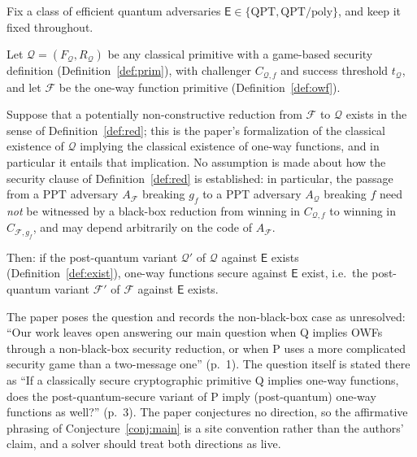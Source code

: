 \documentclass{aicr-conjecture}
\newcommand{\Qc}{\mathcal{Q}}
\newcommand{\Fc}{\mathcal{F}}
\newcommand{\Es}{\mathsf{E}}
\newcommand{\PPT}{\mathrm{PPT}}
\newcommand{\QPT}{\mathrm{QPT}}
\newcommand{\QPTpoly}{\mathrm{QPT}/\mathrm{poly}}
\begin{document}
\begin{conjecture}\label{conj:main}
Fix a class of efficient quantum adversaries
$\Es \in \{\QPT, \QPTpoly\}$, and keep it fixed throughout.

Let $\Qc = (F_{\Qc}, R_{\Qc})$ be any classical primitive with a
game-based security definition (Definition~\ref{def:prim}), with
challenger $C_{\Qc,f}$ and success threshold $t_{\Qc}$, and let $\Fc$ be
the one-way function primitive (Definition~\ref{def:owf}).

Suppose that a potentially non-constructive reduction from $\Fc$ to
$\Qc$ exists in the sense of Definition~\ref{def:red}; this is the
paper's formalization of the classical existence of $\Qc$ implying the
classical existence of one-way functions, and in particular it entails
that implication. No assumption is made about how the security clause of
Definition~\ref{def:red} is established: in particular, the passage from
a $\PPT$ adversary $A_{\Fc}$ breaking $g_f$ to a $\PPT$ adversary
$A_{\Qc}$ breaking $f$ need \emph{not} be witnessed by a black-box
reduction from winning in $C_{\Qc,f}$ to winning in $C_{\Fc,g_f}$, and
may depend arbitrarily on the code of $A_{\Fc}$.

Then: if the post-quantum variant $\Qc'$ of $\Qc$ against $\Es$ exists
(Definition~\ref{def:exist}), one-way functions secure against $\Es$
exist, i.e.\ the post-quantum variant $\Fc'$ of $\Fc$ against $\Es$
exists.
\end{conjecture}

\begin{remark}[openness]\label{rem:open}
The paper poses the question and records the non-black-box case as
unresolved: ``Our work leaves open answering our main question when Q
implies OWFs through a non-black-box security reduction, or when P uses a
more complicated security game than a two-message one'' (p.~1). The
question itself is stated there as ``If a classically secure
cryptographic primitive Q implies one-way functions, does the
post-quantum-secure variant of P imply (post-quantum) one-way functions
as well?'' (p.~3). The paper conjectures no direction, so the affirmative
phrasing of Conjecture~\ref{conj:main} is a site convention rather than
the authors' claim, and a solver should treat both directions as live.
\end{remark}
\end{document}
